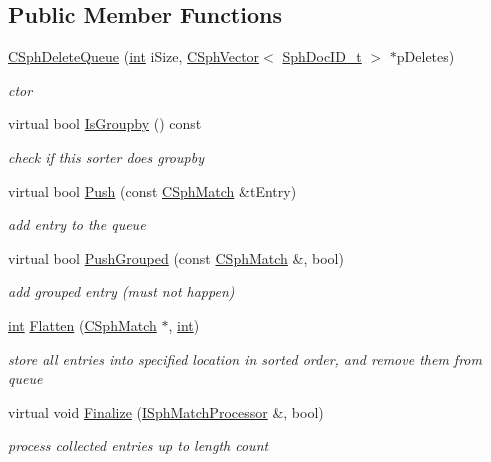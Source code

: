 \subsection*{Public Member Functions}
\begin{DoxyCompactItemize}
\item 
\hyperlink{classCSphDeleteQueue_a9d39a7a5055078c5f76c9ec45485f470}{C\-Sph\-Delete\-Queue} (\hyperlink{sphinxexpr_8cpp_a4a26e8f9cb8b736e0c4cbf4d16de985e}{int} i\-Size, \hyperlink{classCSphVector}{C\-Sph\-Vector}$<$ \hyperlink{sphinx_8h_a3176771631c12a9e4897272003e6b447}{Sph\-Doc\-I\-D\-\_\-t} $>$ $\ast$p\-Deletes)
\begin{DoxyCompactList}\small\item\em ctor \end{DoxyCompactList}\item 
virtual bool \hyperlink{classCSphDeleteQueue_a2e549eb8b7bae5b82c1f2ab0b91c0d7e}{Is\-Groupby} () const 
\begin{DoxyCompactList}\small\item\em check if this sorter does groupby \end{DoxyCompactList}\item 
virtual bool \hyperlink{classCSphDeleteQueue_a8d3291db74bb720af6c0bdcdb6ab24c4}{Push} (const \hyperlink{classCSphMatch}{C\-Sph\-Match} \&t\-Entry)
\begin{DoxyCompactList}\small\item\em add entry to the queue \end{DoxyCompactList}\item 
virtual bool \hyperlink{classCSphDeleteQueue_a506f6b3688d381ec54420694d74a08a9}{Push\-Grouped} (const \hyperlink{classCSphMatch}{C\-Sph\-Match} \&, bool)
\begin{DoxyCompactList}\small\item\em add grouped entry (must not happen) \end{DoxyCompactList}\item 
\hyperlink{sphinxexpr_8cpp_a4a26e8f9cb8b736e0c4cbf4d16de985e}{int} \hyperlink{classCSphDeleteQueue_a6854f7a4d0e3fdda80b41eccab76b288}{Flatten} (\hyperlink{classCSphMatch}{C\-Sph\-Match} $\ast$, \hyperlink{sphinxexpr_8cpp_a4a26e8f9cb8b736e0c4cbf4d16de985e}{int})
\begin{DoxyCompactList}\small\item\em store all entries into specified location in sorted order, and remove them from queue \end{DoxyCompactList}\item 
virtual void \hyperlink{classCSphDeleteQueue_aa20f33712096d51fee04ef18b4fc609d}{Finalize} (\hyperlink{structISphMatchProcessor}{I\-Sph\-Match\-Processor} \&, bool)
\begin{DoxyCompactList}\small\item\em process collected entries up to length count \end{DoxyCompactList}\end{DoxyCompactItemize}
